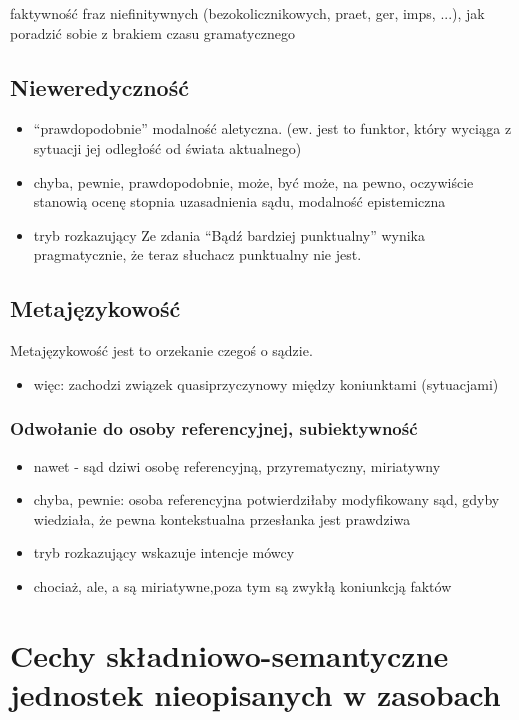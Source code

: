 \documentclass[a4paper, 12pt]{article}
\theoremstyle{remark}
\begin{document}
faktywność fraz niefinitywnych (bezokolicznikowych, praet, ger, imps, ...), jak poradzić sobie z brakiem czasu gramatycznego



\subsection{Nieweredyczność}
\begin{itemize}
\item ``prawdopodobnie'' modalność aletyczna. (ew. jest to funktor, który wyciąga z sytuacji jej odległość od świata aktualnego)

\item chyba, pewnie, prawdopodobnie, może, być może, na pewno, oczywiście stanowią ocenę stopnia uzasadnienia sądu, modalność epistemiczna

\item tryb rozkazujący
Ze zdania ``Bądź bardziej punktualny'' wynika pragmatycznie, że teraz słuchacz punktualny nie jest.
\end{itemize}

\subsection{Metajęzykowość}
Metajęzykowość jest to orzekanie czegoś o sądzie.
\begin{itemize}
\item więc: zachodzi związek quasiprzyczynowy między koniunktami (sytuacjami)
\end{itemize}
\subsubsection{Odwołanie do osoby referencyjnej, subiektywność}
\begin{itemize}
\item nawet - sąd dziwi osobę referencyjną, przyrematyczny, miriatywny
\item chyba, pewnie: osoba referencyjna potwierdziłaby modyfikowany sąd, gdyby wiedziała, że pewna kontekstualna 
przesłanka jest prawdziwa
\item tryb rozkazujący wskazuje intencje mówcy
\item chociaż, ale, a są miriatywne,poza tym są zwykłą koniunkcją faktów
\end{itemize}

\section{Cechy składniowo-semantyczne jednostek nieopisanych w zasobach} %
\end{document}
